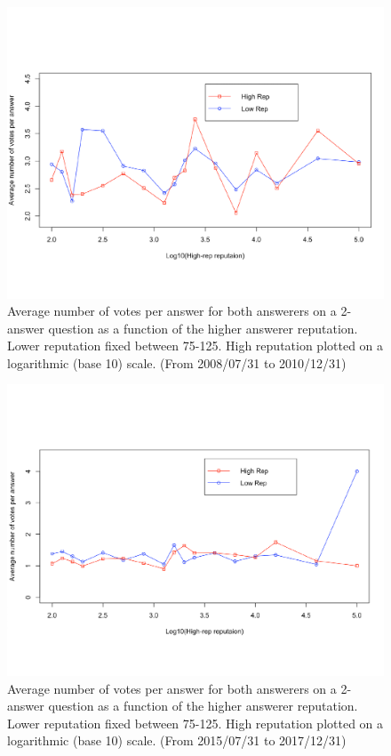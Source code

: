\begin{figure}[!t]
    \centering
    \includegraphics[width=0.8\columnwidth]{img/Fig6_2010.pdf}
    \caption{Average number of votes per answer for both answerers on a 2-answer question as a function of the higher answerer reputation. Lower reputation fixed between 75-125. High reputation plotted on a logarithmic (base 10) scale. (From 2008/07/31 to 2010/12/31)}
    \label{fig:fig6_2010}
\end{figure}

\begin{figure}[!t]
    \centering
    \includegraphics[width=0.8\columnwidth]{img/Fig6_2017.pdf}
    \caption{Average number of votes per answer for both answerers on a 2-answer question as a function of the higher answerer reputation. Lower reputation fixed between 75-125. High reputation plotted on a logarithmic (base 10) scale. (From 2015/07/31 to 2017/12/31)}
    \label{fig:fig6_2017}
\end{figure}

